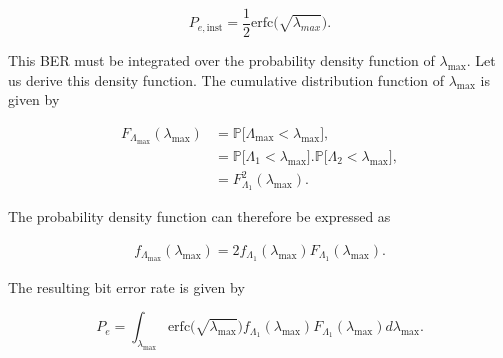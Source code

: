\documentclass [a4paper, 11pt] {article}
\begin{document}
\begin{solution}
\begin{enumerate}
\begin{equation}P_{e,\text{inst}} = \frac{1}{2}\text{erfc}\big(\sqrt{\lambda_{max}}\big).\end{equation}

This BER must be integrated over the probability density function of $\lambda_{\text{max}}$. Let us derive this density function.
The cumulative distribution function of $\lambda_{\text{max}}$ is given by

\begin{align}
    F_{\Lambda_{\text{max}}} (\lambda_{\text{max}}) &= \mathbb{P}\Big[\Lambda_{\text{max}} < \lambda_{\text{max}} \Big], \\
    &= \mathbb{P}\Big[\Lambda_1 < \lambda_{\text{max}} \Big]. \mathbb{P}\Big[\Lambda_2 < \lambda_{\text{max}} \Big], \\
    &= F_{\Lambda_1}^2(\lambda_{\text{max}}).
\end{align}

The probability density function can therefore be expressed as

\begin{align}
     f_{\Lambda_{\text{max}}} (\lambda_{\text{max}}) = 2f_{\Lambda_1}(\lambda_{\text{max}}) F_{\Lambda_1}(\lambda_{\text{max}}).
\end{align}

The resulting bit error rate is given by

\begin{equation}P_{e} = \int_{\lambda_{\text{max}}} \text{erfc}\big(\sqrt{\lambda_{\text{max}}}\big) f_{\Lambda_1}(\lambda_{\text{max}}) F_{\Lambda_1}(\lambda_{\text{max}}) d\lambda_{\text{max}}.\end{equation}

\end{enumerate}
    \end{solution}
\end{document}
